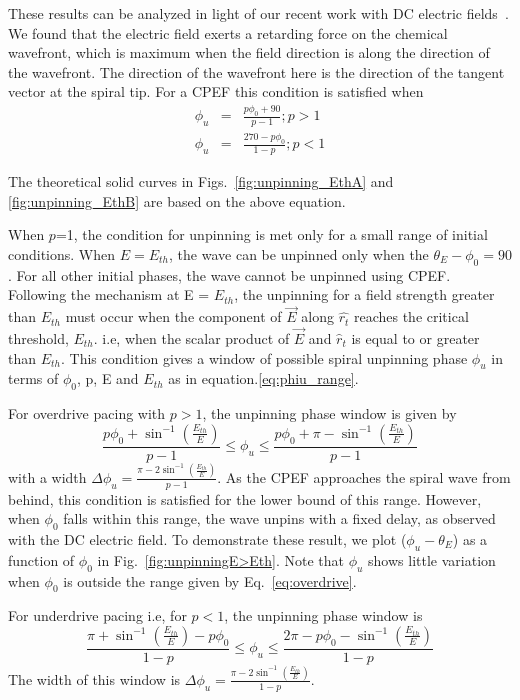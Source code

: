 These results can be analyzed in light of our recent work with DC
electric fields~\cite{Amrutha}. We found that the electric field exerts a
retarding force on the chemical wavefront, which is maximum when the
field direction is along the direction of the wavefront. The direction of the
wavefront here is the direction of the tangent vector at the spiral tip. For a
CPEF this condition is satisfied when 
\begin{eqnarray}
	\phi_u &=& \frac{p \phi_0+ 90}{p-1} ; p>1 \\
	\phi_u &=& \frac{270-p \phi_0}{1-p} ; p<1  
\label{eq:Eth}
\end{eqnarray}

The theoretical solid curves in Figs.~\ref{fig:unpinning_EthA} and
\ref{fig:unpinning_EthB} are based on the above equation.   

When $p$=1, the condition for unpinning is met only for a small range of initial
conditions. When $E=E_{th}$, the wave can be unpinned only when the
$\theta_E-\phi_0 = 90$. For all other initial phases, the wave cannot be unpinned using CPEF.  
Following the mechanism at E = $E_{th}$, the unpinning for a field strength
greater than $E_{th}$ must occur when the component of $\vec{E}$ along
$\hat{r_t}$ reaches the critical threshold, $E_{th}$. i.e, when the scalar
product of ${\vec{E}}$ and ${\hat{r}}_{t}$ is equal to or greater than
$E_{th}$. This condition gives a window of possible spiral unpinning phase
$\phi_{u}$ in terms of $\phi_{0}$, p, E and $E_{th}$ as in
equation.\ref{eq:phiu_range}.

For overdrive pacing with $p>1$, the unpinning phase window is given by
\begin{equation}
\frac{p \phi_0+ {\sin^{-1}}(\frac{E_{th}}{E})}{p-1}   \leq \phi_u \leq \frac{p \phi_0+\pi -{\sin^{-1}}(\frac{E_{th}}{E})}{p-1}
\label{eq:overdrive}
\end{equation}
with a width $\Delta\phi_u = \frac{\pi - 2 \sin^{-1}(\frac{E_{th}}{E})}{p-1}$.
As the CPEF approaches the spiral wave from behind, this condition is satisfied for the lower bound of this range. However, when $\phi_0$ falls within this range, the wave unpins with a fixed delay, as observed with the DC electric field. To demonstrate these result, we plot ($\phi_u-\theta_E$) as a function of $\phi_0$ in Fig.~\ref{fig:unpinningE>Eth}. Note that $\phi_u$  shows little variation when $\phi_0$ is outside the range given by Eq.~\ref{eq:overdrive}.

For underdrive pacing i.e, for $p<1$, the unpinning phase window is 
\begin{equation}
\frac{\pi+ {\sin^{-1}}(\frac{E_{th}}{E})-p \phi_0}{1-p}   \leq \phi_u \leq \frac{2\pi-p \phi_0-{\sin^{-1}}(\frac{E_{th}}{E})}{1-p}
\label{eq:underdrive}
\end{equation}
The width of this window is $\Delta\phi_u = \frac{\pi - 2 \sin^{-1}(\frac{E_{th}}{E})}{1-p}$. 


